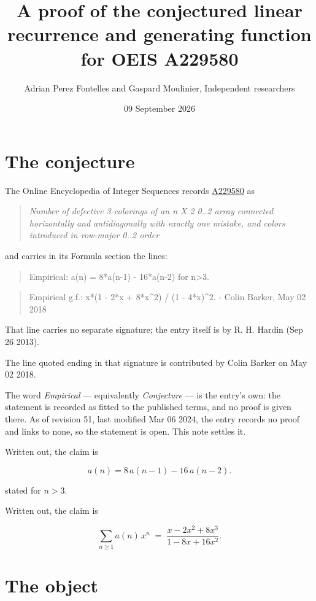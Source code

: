 \documentclass[11pt]{article}
\title{A proof of the conjectured linear recurrence and generating function for OEIS A229580}
\author{Adrian Perez Fontelles and Gaspard Moulinier, Independent researchers}
\date{09 September 2026}
\theoremstyle{definition}
\begin{document}
\maketitle
\section{The conjecture}

The Online Encyclopedia of Integer Sequences records \href{https://oeis.org/A229580}{A229580} as

\begin{quote}\itshape Number of defective 3-colorings of an n X 2 0..2 array connected horizontally and antidiagonally with exactly one mistake, and colors introduced in row-major 0..2 order\end{quote}

and carries in its Formula section the lines:

\begin{quote}\ttfamily Empirical: a(n) = 8*a(n-1) - 16*a(n-2) for n>3.\end{quote}

\begin{quote}\ttfamily Empirical g.f.: x*(1 - 2*x + 8*x\textasciicircum{}2) / (1 - 4*x)\textasciicircum{}2. - Colin Barker, May 02 2018\end{quote}

That line carries no separate signature; the entry itself is by R. H. Hardin (Sep 26 2013).

The line quoted ending in that signature is contributed by Colin Barker on May 02 2018.

The word {\itshape Empirical} --- equivalently {\itshape Conjecture} --- is the entry's own: the statement is recorded as fitted to the published terms, and no proof is given there. As of revision 51, last modified Mar 06 2024, the entry records no proof and links to none, so the statement is open. This note settles it.

Written out, the claim is

\[a(n) = 8\,a(n-1) - 16\,a(n-2).\]

stated for $n > 3$.

Written out, the claim is

\[\sum_{n \ge 1} a(n)\,x^n \;=\; \frac{x - 2x^{2} + 8x^{3}}{1 - 8x + 16x^{2}}.\]

\section{The object}
\end{document}
